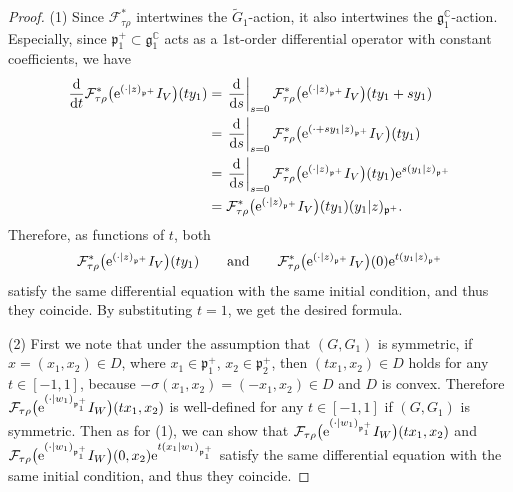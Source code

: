 \documentclass[pdftex]{sigma}
\numberwithin{equation}{section}
\newcommand{\BC}{\mathbb{C}}
\newcommand{\fg}{\mathfrak{g}}
\newcommand{\fp}{\mathfrak{p}}
\newcommand{\cF}{\mathcal{F}}
\begin{document}
\begin{proof}
(1) Since $\cF_{\tau\rho}^*$ intertwines the $\tilde{G}_1$-action, it also intertwines the $\fg^\BC_1$-action.
Especially, since $\fp^+_1\subset \fg^\BC_1$ acts as a 1st-order differential operator with constant coefficients, we have
\begin{align*}
\frac{{\rm d}}{{\rm d}t}\cF_{\tau\rho}^*\big({\rm e}^{(\cdot|z)_{\fp^+}}I_V\big)(ty_1)
&=\left.\frac{{\rm d}}{{\rm d}s}\right|_{s=0}\cF_{\tau\rho}^*\big({\rm e}^{(\cdot|z)_{\fp^+}}I_V\big)(ty_1+sy_1) \\
&=\left.\frac{{\rm d}}{{\rm d}s}\right|_{s=0}\cF_{\tau\rho}^*\big({\rm e}^{(\cdot+sy_1|z)_{\fp^+}}I_V\big)(ty_1)\\
& =\left.\frac{{\rm d}}{{\rm d}s}\right|_{s=0}\cF_{\tau\rho}^*\big({\rm e}^{(\cdot|z)_{\fp^+}}I_V\big)(ty_1){\rm e}^{s(y_1|z)_{\fp^+}} \\
&=\cF_{\tau\rho}^*\big({\rm e}^{(\cdot|z)_{\fp^+}}I_V\big)(ty_1)(y_1|z)_{\fp^+}.
\end{align*}
Therefore, as functions of $t$, both
\begin{gather*} \cF_{\tau\rho}^*\big({\rm e}^{(\cdot|z)_{\fp^+}}I_V\big)(ty_1)\qquad \text{and} \qquad
\cF_{\tau\rho}^*\big({\rm e}^{(\cdot|z)_{\fp^+}}I_V\big)(0){\rm e}^{t(y_1|z)_{\fp^+}} \end{gather*}
satisfy the same differential equation with the same initial condition, and thus they coincide.
By substituting $t=1$, we get the desired formula.

(2) First we note that under the assumption that $(G,G_1)$ is symmetric,
if $x=(x_1,x_2)\in D$, where $x_1\in\fp^+_1$, $x_2\in\fp^+_2$, then $(tx_1,x_2)\in D$ holds for any $t\in[-1,1]$,
because $-\sigma(x_1,x_2)=(-x_1,x_2)\in D$ and $D$ is convex.
Therefore $\cF_{\tau\rho}\big({\rm e}^{(\cdot|w_1)_{\fp^+_1}}I_W\big)(tx_1,x_2)$ is well-defined for any $t\in[-1,1]$ if $(G,G_1)$ is symmetric.
Then as for (1), we can show that $\cF_{\tau\rho}\big({\rm e}^{(\cdot|w_1)_{\fp^+_1}}I_W\big)(tx_1,x_2)$ and
$\cF_{\tau\rho}\big({\rm e}^{(\cdot|w_1)_{\fp^+_1}}I_W\big)(0,x_2){\rm e}^{t(x_1|w_1)_{\fp^+_1}}$ satisfy the same differential equation
with the same initial condition, and thus they coincide.
\end{proof}
\end{document}
